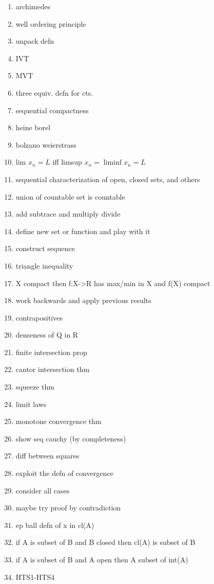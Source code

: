 \begin{enumerate}

\item archimedes
\item well ordering principle
\item unpack defn
\item IVT
\item MVT
\item three equiv. defn for cts.
\item sequential compactness
\item heine borel
\item bolzano weierstrass
\item lim $x_n=L$ iff limsup $x_n=\liminf x_n=L$
\item sequential characterization of open, closed sets, and others
\item union of countable set is countable
\item add subtrace and multiply divide
\item define new set or function and play with it
\item construct sequence
\item triangle inequality
\item X compact then f:X->R has max/min in X and f(X) compact
\item work backwards and apply previous results
\item contrapositives
\item denseness of Q in R
\item finite intersection prop
\item cantor intersection thm
\item squeeze thm
\item limit laws
\item monotone convergence thm
\item show seq cauchy (by completeness)
\item diff between squares
\item exploit the defn of convergence
\item consider all cases
\item maybe try proof by contradiction
\item ep ball defn of x in cl(A)
\item if A is subset of B and B closed then cl(A) is subset of B
\item if A is subset of B and A open then A subset of int(A)
\item HTS1-HTS4

\end{enumerate}

